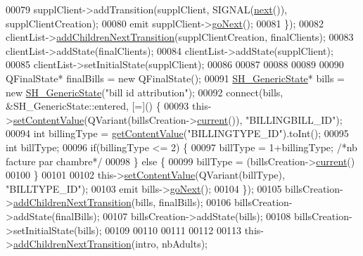 \begin{DoxyCode}
00079         supplClient->addTransition(supplClient, SIGNAL(\hyperlink{classSH__GenericStateMachine_af4771d31d87951c997fba1633c2d67f6}{next}()), supplClientCreation);
00080         emit supplClient->\hyperlink{classSH__GenericState_a34c1bebc765cc3a62d66c94c37d4f0c3}{goNext}();
00081     \});
00082     clientList->\hyperlink{classSH__LoopingInOutStateMachine_abfae9f47019379f270496de46845c729}{addChildrenNextTransition}(supplClientCreation, finalClients);
00083     clientList->addState(finalClients);
00084     clientList->addState(supplClient);
00085     clientList->setInitialState(supplClient);
00086 
00087 
00088 
00089 
00090     QFinalState* finalBills = \textcolor{keyword}{new} QFinalState();
00091     \hyperlink{classSH__GenericState}{SH\_GenericState}* bills = \textcolor{keyword}{new} \hyperlink{classSH__GenericState}{SH\_GenericState}(\textcolor{stringliteral}{"bill id attribution"});
00092     connect(bills, &SH\_GenericState::entered, [=]() \{
00093         this->\hyperlink{classSH__InOutStateMachine_a9ab1534306b2bdb62743d4bcefe40c17}{setContentValue}(QVariant(billsCreation->\hyperlink{classSH__LoopingInOutStateMachine_afce58401195a4941b1939c46f1caa23b}{current}()), \textcolor{stringliteral}{"BILLINGBILL\_ID"});
00094         \textcolor{keywordtype}{int} billingType = \hyperlink{classSH__InOutStateMachine_aa1a3bd3c0ea8a59b9bc916dc718eb9ca}{getContentValue}(\textcolor{stringliteral}{"BILLINGTYPE\_ID"}).toInt();
00095         \textcolor{keywordtype}{int} billType;
00096         \textcolor{keywordflow}{if}(billingType <= 2) \{
00097             billType = 1+billingType; \textcolor{comment}{/*nb facture par chambre*/}
00098         \} \textcolor{keywordflow}{else} \{
00099             billType = (billsCreation->\hyperlink{classSH__LoopingInOutStateMachine_afce58401195a4941b1939c46f1caa23b}{current}() %
00100         \}
00101 
00102         this->\hyperlink{classSH__InOutStateMachine_a9ab1534306b2bdb62743d4bcefe40c17}{setContentValue}(QVariant(billType), \textcolor{stringliteral}{"BILLTYPE\_ID"});
00103         emit bills->\hyperlink{classSH__GenericState_a34c1bebc765cc3a62d66c94c37d4f0c3}{goNext}();
00104     \});
00105     billsCreation->\hyperlink{classSH__LoopingInOutStateMachine_abfae9f47019379f270496de46845c729}{addChildrenNextTransition}(bills, finalBills);
00106     billsCreation->addState(finalBills);
00107     billsCreation->addState(bills);
00108     billsCreation->setInitialState(bills);
00109 
00110 
00111 
00112 
00113     this->\hyperlink{classSH__InOutStateMachine_aa78420f8778d7777809aad77eb8473b4}{addChildrenNextTransition}(intro, nbAdults);

\end{DoxyCode}

